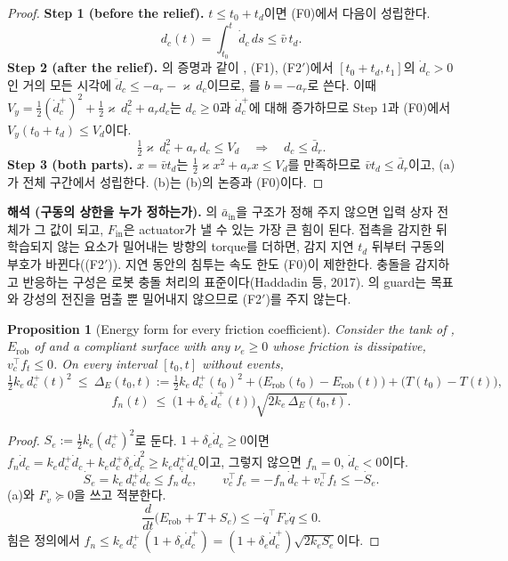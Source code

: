 \documentclass[11pt]{article}\usepackage[margin=1in]{geometry}\usepackage{amsmath,amssymb,amsthm,mathtools}\usepackage{graphicx}\graphicspath{{figures/}{../figures/}{figs/}{./}}\usepackage{enumitem}\usepackage{hyperref}\usepackage{cleveref}\usepackage{tikz}\usetikzlibrary{arrows.meta,positioning,calc,shapes.geometric}\usepackage{float}\usepackage{rotating}\usepackage[most]{tcolorbox}\usepackage{kotex}\usepackage{booktabs}\usepackage{longtable}\emergencystretch=1.6em\tolerance=2000 \crefname{assumption}{Assumption}{Assumptions}\Crefname{assumption}{Assumption}{Assumptions}\crefname{definition}{Definition}{Definitions}\Crefname{definition}{Definition}{Definitions}\crefname{proposition}{Proposition}{Propositions}\Crefname{proposition}{Proposition}{Propositions}\crefname{fact}{Fact}{Facts}\Crefname{fact}{Fact}{Facts} \newtheorem{assumption}{Assumption}\newtheorem{definition}{Definition}\newtheorem{lemma}{Lemma}\newtheorem{proposition}{Proposition}\newtheorem{theorem}{Theorem}\newtheorem{corollary}{Corollary}\newtheorem{fact}{Fact}\theoremstyle{remark}\newtheorem{remark}{Remark} \newcommand{\R}{\mathbb{R}}\newcommand{\xb}{\bar x}\newcommand{\Ab}{\bar A}\newcommand{\By}{\bar B_y}\newcommand{\U}{\mathcal U}\newcommand{\Z}{\mathcal Z}
\begin{document}
\begin{proof}
\textbf{Step 1 (before the relief).} $t\le t_0+t_d$이면 (F0)에서 다음이 성립한다.
\[
d_c(t)=\int_{t_0}^t\dot d_c\,ds\le\bar v\,t_d .
\]
\textbf{Step 2 (after the relief).} 의 증명과 같이 , (F1), (F2$'$)에서 $[t_0+t_d,t_1]$의 $\dot d_c>0$인 거의 모든 시각에 $\ddot d_c\le-a_r-\varkappa\,d_c$이므로, 를 $b=-a_r$로 쓴다. 이때 $V_y=\tfrac12(\dot d_c^+)^2+\tfrac12\varkappa\,d_c^2+a_rd_c$는 $d_c\ge0$과 $\dot d_c^+$에 대해 증가하므로 Step 1과 (F0)에서 $V_y(t_0+t_d)\le V_d$이다.
\[
\tfrac12\varkappa\,d_c^2+a_r\,d_c\le V_d\quad\Longrightarrow\quad d_c\le\bar d_r .
\]
\textbf{Step 3 (both parts).} $x=\bar vt_d$는 $\tfrac12\varkappa x^2+a_rx\le V_d$를 만족하므로 $\bar vt_d\le\bar d_r$이고, (a)가 전체 구간에서 성립한다. (b)는 (b)의 논증과 (F0)이다.
\end{proof}

\textbf{해석 (구동의 상한을 누가 정하는가).} 의 $\bar a_{\mathrm{in}}$을 구조가 정해 주지 않으면 입력 상자 전체가 그 값이 되고, $F_{\mathrm{in}}$은 actuator가 낼 수 있는 가장 큰 힘이 된다. 접촉을 감지한 뒤 학습되지 않는 요소가 밀어내는 방향의 torque를 더하면, 감지 지연 $t_d$ 뒤부터 구동의 부호가 바뀐다((F2$'$)). 지연 동안의 침투는 속도 한도 (F0)이 제한한다. 충돌을 감지하고 반응하는 구성은 로봇 충돌 처리의 표준이다(Haddadin 등, 2017). 의 guard는 목표와 강성의 전진을 멈출 뿐 밀어내지 않으므로 (F2$'$)를 주지 않는다.

\begin{proposition}[Energy form for every friction coefficient]
\label{prop:energyforce}
Consider the tank of , $E_{\mathrm{rob}}$ of  and a compliant surface with any $\nu_e\ge0$ whose friction is dissipative, $v_c^\top f_t\le0$. On every interval $[t_0,t]$ without events,
\[
\tfrac12k_e\,d_c^+(t)^2\ \le\ \Delta_E(t_0,t):=\tfrac12k_e\,d_c^+(t_0)^2+\big(E_{\mathrm{rob}}(t_0)-E_{\mathrm{rob}}(t)\big)+\big(T(t_0)-T(t)\big),
\]
\[
f_n(t)\ \le\ \big(1+\delta_e\,\dot d_c^+(t)\big)\sqrt{2k_e\,\Delta_E(t_0,t)} .
\]
\end{proposition}

\begin{proof}
$S_e:=\tfrac12k_e(d_c^+)^2$로 둔다. $1+\delta_e\dot d_c\ge0$이면 $f_n\dot d_c=k_ed_c^+\dot d_c+k_ed_c^+\delta_e\dot d_c^2\ge k_ed_c^+\dot d_c$이고, 그렇지 않으면 $f_n=0$, $\dot d_c<0$이다.
\[
\dot S_e=k_e\,d_c^+\dot d_c\le f_n\,\dot d_c,\qquad v_c^\top f_e=-f_n\,\dot d_c+v_c^\top f_t\le-\dot S_e .
\]
(a)와 $F_v\succeq0$을 쓰고 적분한다.
\[
\frac{d}{dt}\big(E_{\mathrm{rob}}+T+S_e\big)\le-\dot q^\top F_v\dot q\le0 .
\]
힘은 정의에서 $f_n\le k_e\,d_c^+\,(1+\delta_e\dot d_c^+)=(1+\delta_e\dot d_c^+)\sqrt{2k_eS_e}$이다.
\end{proof}
\end{document}
